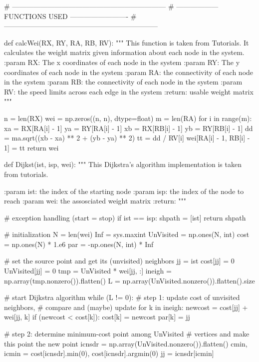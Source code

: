 \documentclass[paper=a4, fontsize=12pt]{scrartcl} %
\numberwithin{equation}{section}       %
\numberwithin{figure}{section}         %
\numberwithin{table}{section}          %
\begin{document}
\begin{python}
# ------------------------------------------------------------------
# ------------------    FUNCTIONS USED     -------------------------
# ------------------------------------------------------------------

def calcWei(RX, RY, RA, RB, RV):
    """
    This function is taken from Tutorials. It calculates the weight matrix
    given information about each node in the system.
    :param RX: The x coordinates of each node in the system
    :param RY: The y coordinates of each node in the system
    :param RA: the connectivity of each node in the system
    :param RB: the connectivity of each node in the system
    :param RV: the speed limits across each edge in the system
    :return: usable weight matrix
    """

    n = len(RX)
    wei = np.zeros((n, n), dtype=float)
    m = len(RA)
    for i in range(m):
        xa = RX[RA[i] - 1]
        ya = RY[RA[i] - 1]
        xb = RX[RB[i] - 1]
        yb = RY[RB[i] - 1]
        dd = ma.sqrt((xb - xa) ** 2 + (yb - ya) ** 2)
        tt = dd / RV[i]
        wei[RA[i] - 1, RB[i] - 1] = tt
    return wei
    
def Dijkst(ist, isp, wei):
    """
    This Dijkstra's algorithm implementation is taken from tutorials.
    
    :param ist: the index of the starting node
    :param isp: the index of the node to reach
    :param wei: the assosciated weight matrix
    :return: 
    """

    # exception handling (start = stop)
    if ist == isp:
        shpath = [ist]
        return shpath

    # initialization
    N = len(wei)
    Inf = sys.maxint
    UnVisited = np.ones(N, int)
    cost = np.ones(N) * 1.e6
    par = -np.ones(N, int) * Inf

    # set the source point and get its (unvisited) neighbors
    jj = ist
    cost[jj] = 0
    UnVisited[jj] = 0
    tmp = UnVisited * wei[jj, :]
    ineigh = np.array(tmp.nonzero()).flatten()
    L = np.array(UnVisited.nonzero()).flatten().size

    # start Dijkstra algorithm
    while (L != 0):
        # step 1: update cost of unvisited neighbors,
        #         compare and (maybe) update
        for k in ineigh:
            newcost = cost[jj] + wei[jj, k]
            if (newcost < cost[k]):
                cost[k] = newcost
                par[k] = jj

        # step 2: determine minimum-cost point among UnVisited
        #         vertices and make this point the new point
        icnsdr = np.array(UnVisited.nonzero()).flatten()
        cmin, icmin = cost[icnsdr].min(0), cost[icnsdr].argmin(0)
        jj = icnsdr[icmin]


\end{python}
\end{document}

